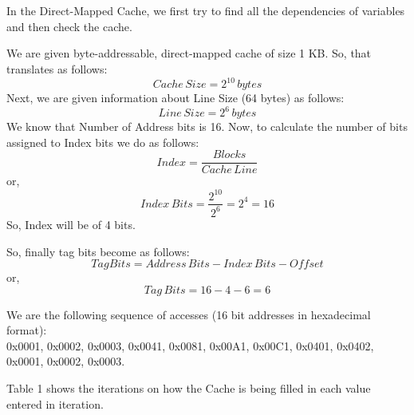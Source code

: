 \documentclass[12pt]{article}
\begin{document}
\maketitle


\section{}
In the Direct-Mapped Cache, we first try to find all the dependencies of variables and then check the cache.

We are given byte-addressable, direct-mapped cache of size 1 KB. So, that translates as follows:
\begin{equation*}
    Cache \, Size = 2^{10} \, bytes
\end{equation*}
Next, we are given information about Line Size (64 bytes) as follows:
\begin{equation*}
    Line \, Size = 2^6 \, bytes
\end{equation*}
We know that Number of Address bits is 16. Now, to calculate the number of bits assigned to Index bits we do as follows:
\begin{equation*}
    Index = \frac{Blocks}{Cache \, Line}
\end{equation*}
or,
\begin{equation*}
    Index \, Bits = \frac{2^{10}}{2^6} = 2^4 = 16
\end{equation*}
	So, Index will be of 4 bits.
	
So, finally tag bits become as follows:
\begin{equation*}
    Tag Bits = Address \, Bits - Index \, Bits - Offset
\end{equation*}
or,
\begin{equation*}
    Tag \, Bits = 16 - 4 - 6 = 6
\end{equation*}

We are the following sequence of accesses (16 bit addresses in hexadecimal format): \\ 
0x0001, 0x0002, 0x0003, 0x0041, 0x0081, 0x00A1, 0x00C1, 0x0401, 0x0402, 0x0001, 0x0002, 0x0003.

Table 1 shows the iterations on how the Cache is being filled in each value entered in iteration.
\end{document}
